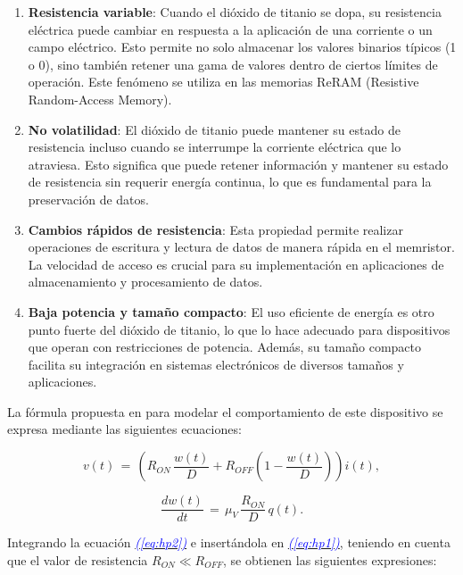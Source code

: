 \documentclass[12pt,a4paper]{report} %
\newcommand{\eref}[1]{\hyperref[#1]{\textcolor{blue}{\textit{(\ref*{#1})}}}}
\begin{document}
	\begin{enumerate}
		\item \textbf{Resistencia variable}: Cuando el dióxido de titanio se dopa, su resistencia eléctrica puede cambiar en respuesta a la aplicación de una corriente o un campo eléctrico. Esto permite no solo almacenar los valores binarios típicos (1 o 0), sino también retener una gama de valores dentro de ciertos límites de operación. Este fenómeno se utiliza en las memorias ReRAM (Resistive Random-Access Memory).
		\item \textbf{No volatilidad}: El dióxido de titanio puede mantener su estado de resistencia incluso cuando se interrumpe la corriente eléctrica que lo atraviesa. Esto significa que puede retener información y mantener su estado de resistencia sin requerir energía continua, lo que es fundamental para la preservación de datos.
		\item \textbf{Cambios rápidos de resistencia}: Esta propiedad permite realizar operaciones de escritura y lectura de datos de manera rápida en el memristor. La velocidad de acceso es crucial para su implementación en aplicaciones de almacenamiento y procesamiento de datos.
		\item \textbf{Baja potencia y tamaño compacto}: El uso eficiente de energía es otro punto fuerte del dióxido de titanio, lo que lo hace adecuado para dispositivos que operan con restricciones de potencia. Además, su tamaño compacto facilita su integración en sistemas electrónicos de diversos tamaños y aplicaciones.
	\end{enumerate}
	
	\newpage
	
	La fórmula propuesta en \cite{HP} para modelar el comportamiento de este dispositivo se expresa mediante las siguientes ecuaciones:
	
	\begin{equation}
		v(t)\,=\,\left(R_{ON}\,\frac{w(t)}{D}+R_{OFF}\left(1-\frac{w(t)}{D}\right)\right)i(t),
		\label{eq:hp1}
	\end{equation}\smallskip
	
	\begin{equation}
		\frac{dw(t)}{dt}\,=\,\mu_V\,\frac{R_{ON}}{D}\,q(t).
		\label{eq:hp2}
	\end{equation}\smallskip
	
	\noindent Integrando la ecuación \eref{eq:hp2} e insertándola en \eref{eq:hp1}, teniendo en cuenta que el valor de resistencia $R_{ON} \ll R_{OFF}$, se obtienen las siguientes expresiones:
	
\end{document}

